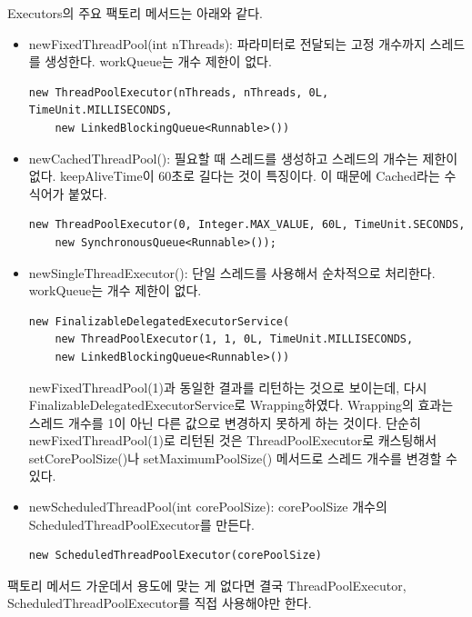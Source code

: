 Executors의 주요 팩토리 메서드는 아래와 같다.
\begin{itemize}

\item newFixedThreadPool(int nThreads): 파라미터로 전달되는 고정 개수까지 스레드를 생성한다. workQueue는 개수 제한이 없다.
\begin{lstlisting}[frame=single] 
new ThreadPoolExecutor(nThreads, nThreads, 0L, TimeUnit.MILLISECONDS, 
    new LinkedBlockingQueue<Runnable>())
\end{lstlisting}

\item newCachedThreadPool(): 필요할 때 스레드를 생성하고 스레드의 개수는 제한이 없다. keepAliveTime이 60초로 길다는 것이 특징이다. 이 때문에 Cached라는 수식어가 붙었다.
\begin{lstlisting}[frame=single] 
new ThreadPoolExecutor(0, Integer.MAX_VALUE, 60L, TimeUnit.SECONDS, 
    new SynchronousQueue<Runnable>());
\end{lstlisting}

\item newSingleThreadExecutor(): 단일 스레드를 사용해서 순차적으로 처리한다. workQueue는 개수 제한이 없다. 
\begin{lstlisting}[frame=single] 
new FinalizableDelegatedExecutorService(
	new ThreadPoolExecutor(1, 1, 0L, TimeUnit.MILLISECONDS, 
	new LinkedBlockingQueue<Runnable>())
\end{lstlisting}
newFixedThreadPool(1)과 동일한 결과를 리턴하는 것으로 보이는데, 다시 FinalizableDelegatedExecutorService로 Wrapping하였다. Wrapping의 효과는 스레드 개수를 1이 아닌 다른 값으로 변경하지 못하게 하는 것이다. 단순히 newFixedThreadPool(1)로 리턴된 것은 ThreadPoolExecutor로 캐스팅해서 setCorePoolSize()나 setMaximumPoolSize() 메서드로 스레드 개수를 변경할 수 있다.

\item newScheduledThreadPool(int corePoolSize): corePoolSize 개수의 ScheduledThreadPoolExecutor를 만든다.
\begin{lstlisting}[frame=single] 
new ScheduledThreadPoolExecutor(corePoolSize)
\end{lstlisting}

\end{itemize}

팩토리 메서드 가운데서 용도에 맞는 게 없다면 결국 ThreadPoolExecutor, ScheduledThreadPoolExecutor를 직접 사용해야만 한다.\\

